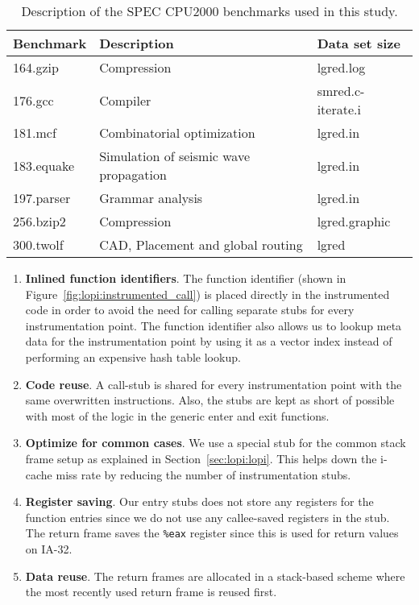 \begin{table*}[thb]
  \begin{center}
    \caption[Benchmark description]{Description of the SPEC CPU2000 benchmarks
      used in this study.}
  \label{tab:lopi:benchmarks}
  \begin{tabular}{|l|l|l|}
       \hline
       \hline
       Benchmark  & Description & Data set size \\
       \hline
       \hline
       164.gzip   & Compression & lgred.log \\
       \hline
       176.gcc    & Compiler & smred.c-iterate.i \\
       \hline
       181.mcf    & Combinatorial optimization & lgred.in \\
       \hline
       183.equake & Simulation of seismic wave propagation & lgred.in \\
       \hline
       197.parser & Grammar analysis & lgred.in \\
       \hline
       256.bzip2   & Compression & lgred.graphic \\
       \hline
       300.twolf   & CAD, Placement and global routing & lgred \\
       \hline
       \hline
  \end{tabular}
  \end{center}
\end{table*}

\begin{enumerate}
\item \textbf{Inlined function identifiers}. The function identifier (shown in
  Figure~\ref{fig:lopi:instrumented_call}) is placed directly in the instrumented
  code in order to avoid the need for calling separate stubs for every
  instrumentation point. The function identifier also allows us to lookup
  meta data for the instrumentation point by using it as a vector index
  instead of performing an expensive hash table lookup.
\item \textbf{Code reuse}. A call-stub is shared for every instrumentation
  point with the same overwritten instructions. Also, the stubs are kept as
  short of possible with most of the logic in the generic enter and exit
  functions.
\item \textbf{Optimize for common cases}. We use a special stub for the common
  stack frame setup as explained in Section~\ref{sec:lopi:lopi}. This helps down the
  i-cache miss rate by reducing the number of instrumentation stubs.

\item \textbf{Register saving}. Our entry stubs does not store any registers
  for the function entries since we do not use any callee-saved registers in
  the stub. The return frame saves the \texttt{\%eax} register since this is
  used for return values on IA-32.
\item \textbf{Data reuse}. The return frames are allocated in a stack-based scheme
  where the most recently used return frame is reused first.
\end{enumerate}


